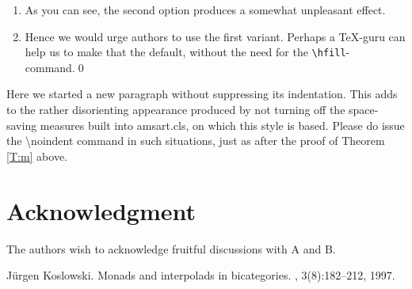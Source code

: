 \documentclass{jpc} %
\theoremstyle{plain}\newtheorem{satz}[thm]{Satz} %
\begin{document}
\proof %
\begin{enumerate}%
\item
  As you can see, the second option produces a somewhat unpleasant effect.
\item
  Hence we would urge authors to use the first variant.  Perhaps a
  \TeX-guru can help us to make that the default, without the need for
  the \texttt{\textbackslash hfill}-command.\qed
\end{enumerate}

  Here we started a new paragraph without suppressing its
  indentation.  This adds to the rather disorienting appearance
  produced by not turning off the space-saving measures built into
  amsart.cls, on which this style is based.  Please do issue the
  \hbox{\textbackslash noindent} command in such situations, just as
  after the proof of Theorem \ref{T:m} above.

\section*{Acknowledgment}
  \noindent The authors wish to acknowledge fruitful discussions with
  A and B.


\begin{thebibliography}{Kos97}

J{\"u}rgen Koslowski.
\newblock Monads and interpolads in bicategories.
, 3(8):182--212, 1997.

\end{thebibliography}

\appendix
\end{document}
